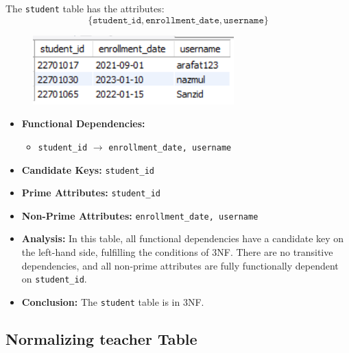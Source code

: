 The \texttt{student} table has the attributes:
\[
\{ \texttt{student\_id}, \texttt{enrollment\_date}, \texttt{username} \}
\]
\begin{figure}
    [h]
    \centering
    \includegraphics{images/table_data/student_table (1).png}
\end{figure}
\begin{itemize}
    \item \textbf{Functional Dependencies:}
    \begin{itemize}
        \item \texttt{student\_id} $\rightarrow$ \texttt{enrollment\_date, username}
    \end{itemize}

    \item \textbf{Candidate Keys:} \texttt{student\_id}

    \item \textbf{Prime Attributes:} \texttt{student\_id}

    \item \textbf{Non-Prime Attributes:} \texttt{enrollment\_date, username}

    \item \textbf{Analysis:} In this table, all functional dependencies have a candidate key on the left-hand side, fulfilling the conditions of 3NF. There are no transitive dependencies, and all non-prime attributes are fully functionally dependent on \texttt{student\_id}.

    \item \textbf{Conclusion:} The \texttt{student} table is in 3NF.
\end{itemize}

\subsection{Normalizing teacher Table}


